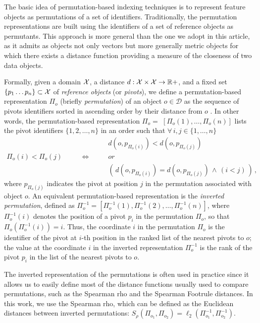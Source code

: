 The basic idea of permutation-based indexing techniques is to represent feature objects as permutations of a set of identifiers.
Traditionally, the permutation representations are built using the identifiers of a set of reference objects as permutants.
This approach is more general than the one we adopt in this article, as it admits as objects not only vectors but more generally metric objects for which there exists a distance function providing a measure of the closeness of two data objects.

Formally, given a domain $\mathcal{X}$, a distance $d:\mathcal{X}\times \mathcal{X}\to \mathbb{R}+$, and a fixed set  $\{p_1\ldots p_n\}\subset\mathcal{X}$ of \emph{reference objects} (or \emph{pivots}), we define a permutation-based representation $\Pi_{o}$ (briefly \emph{permutation}) of an object $o\in \mathcal{D}$ as the sequence of pivots identifiers sorted in ascending order by their distance from $o$ \cite{mtap12,amato2014some}.
In other words, the permutation-based representation $\Pi_{o}=$ $[\Pi_{o}(1), \ldots , \Pi_{o}(n)]$ lists the pivot identifiers $\{1, 2, \ldots, n\}$ in an order such that $\forall\, i,j \in \{1,\ldots, n\}$
\begin{equation}
\begin{matrix}
& & d(o,p_{\Pi_{o}(i)}) <    d(o,p_{\Pi_{o}(j)})\, \\
\Pi_{o}(i)< \Pi_{o}(j)\qquad &\Leftrightarrow\qquad & or \\
& &\left(\, d(o,p_{\Pi_{o}(i)}) =    d(o,p_{\Pi_{o}(j)})\, \wedge\, (i<j)\, \right) \,,
\end{matrix}
\end{equation}
where $p_{\Pi_o(j)}$ indicates the pivot at position $j$ in the permutation associated with object $o$.
An equivalent permutation-based representation is the \emph{inverted permutation}, defined as  $\Pi^{-1}_{o}=[\Pi_{o}^{-1}(1), \Pi_{o}^{-1}(2),\dots , \Pi_{o}^{-1}(n)]$, where $\Pi_{o}^{-1}(i)$ denotes the position of a pivot $p_i$ in the permutation $\Pi_{o}$, so that $\Pi_o(\Pi_o^{-1}(i))=i$.
Thus, the coordinate $i$ in the permutation $\Pi_{o}$ is the identifier of the pivot at $i$-th position in the ranked list of the nearest pivots to $o$;
the value at the coordinate $i$ in the inverted representation $\Pi^{-1}_{o}$ is the rank of the pivot $p_i$ in the list of the nearest pivots to $o$.

The inverted representation of the permutations is often used in practice since it allows us to easily define most of the distance functions usually used to compare permutations, such as the Spearman rho and the Spearman Footrule distances.
In this work, we use the Spearman rho, which can be defined as the Euclidean distances between inverted permutations: $S_\rho (\Pi_{o_1},\Pi_{o_2})=\ell_2(\Pi^{-1}_{o_1},\Pi^{-1}_{o_2})$.

